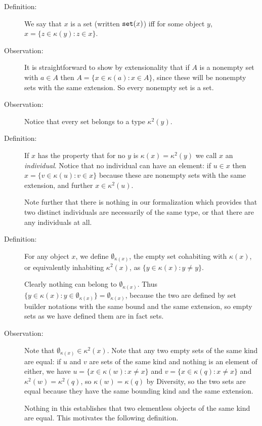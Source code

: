 \documentclass[12pt]{article}
\begin{document}
\begin{description}

\item[Definition:]  We say that $x$ is a set (written ${\tt set}(x)$) iff for some object $y$, $x = \{z \in \kappa(y):z \in x\}$.

\item[Observation:]  It is straightforward to show by extensionality that if $A$ is a nonempty set with $a \in A$ then
$A = \{x \in \kappa(a):x \in A\}$, since these will be nonempty sets with the same extension.  So every nonempty set is a set.

\item[Observation:]  Notice that every set belongs to a type $\kappa^2(y)$.

\item[Definition:]  If $x$ has the property that for no $y$ is $\kappa(x)=\kappa^2(y)$ we call $x$ an {\em individual\/}.  Notice that no 
individual can have an element:  if $u \in x$ then $x = \{v \in \kappa(u):v \in x\}$ because these are nonempty sets with the same extension,
and further $x \in \kappa^2(u)$.

Note further that there is nothing in our formalization which provides that two distinct individuals are necessarily of the same type, or that there are any individuals at all.

\item[Definition:]  For any object $x$, we define $\emptyset_{\kappa(x)}$, the empty set cohabiting with $\kappa(x)$, or equivalently inhabiting $\kappa^2(x)$,  as $\{y \in \kappa(x):y \neq y\}$.

Clearly nothing can belong to $\emptyset_{\kappa(x)}$.  Thus $\{y \in \kappa(x):y \in \emptyset_{\kappa(x)}\} = \emptyset_{\kappa(x)}$, because the two are defined by set builder notations with the same bound and the same extension, so empty sets as we have defined them are in fact sets.

\item[Observation:]  Note that  $\emptyset_{\kappa(x)}\in \kappa^2(x)$.  Note that any two empty sets of the same kind are equal:  if $u$ and $v$ are sets of the same kind
and nothing is an element of either, we have $u = \{x\in \kappa(w):x \neq x\}$ and  $v = \{x\in \kappa(q):x \neq x\}$  and $\kappa^2(w) = \kappa^2(q)$, so $\kappa(w) = \kappa(q)$ by Diversity, so the two sets are equal because they have the same bounding kind and the same extension.

Nothing in this establishes that two elementless objects of the same kind are equal.  This motivates the following definition.


\end{description}
\end{document}
